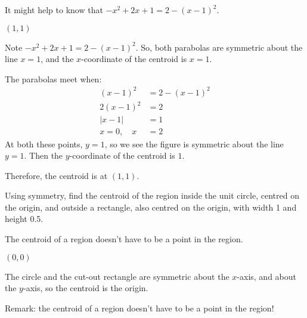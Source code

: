 \begin{hint}
It might help to know that $-x^2+2x+1 = 2-(x-1)^2$.
\end{hint}
\begin{answer}
$(1,1)$
\end{answer}
\begin{solution}
Note $-x^2+2x+1 = 2-(x-1)^2$. So,
both parabolas are symmetric about the line $x=1$, and the $x$-coordinate of the centroid is $x=1$.
\begin{center}
\end{center}
The parabolas meet when:
\begin{align*}
(x-1)^2&=2-(x-1)^2\\
2(x-1)^2&=2\\
|x-1|&=1\\
x=0,\quad x&=2
\end{align*}
At both these points, $y=1$, so we see the figure is symmetric about the line $y=1$. Then the $y$-coordinate of the centroid is $1$.

\begin{center}
\end{center}

Therefore, the centroid is at $(1,1)$.
\end{solution}
\begin{question}
Using symmetry, find the centroid of the region inside the unit circle, centred on the origin, and outside a rectangle, also centred on the origin, with width 1 and height 0.5.
\begin{center}
\end{center}
\end{question}
\begin{hint}
The centroid of a region doesn't have to be a point in the region.
\end{hint}
\begin{answer}
$(0,0)$
\end{answer}
\begin{solution}
The circle and the cut-out rectangle are symmetric about the $x$-axis, and about the $y$-axis, so the centroid is the origin.

Remark: the centroid of a region doesn't have to be a point in the region!
\end{solution}

